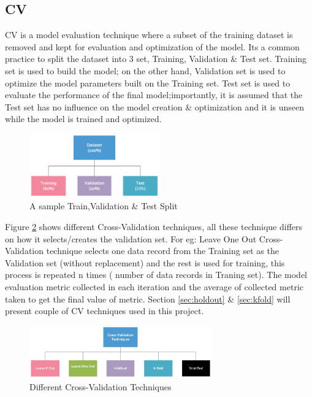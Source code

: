 \documentclass[twoside,11pt,a4paper]{article}
\begin{document}
\subsection{\acf{CV}}

\acf{CV} is a model evaluation technique where a subset of the training dataset is removed and kept for evaluation and optimization of the model. Its a common practice to split the dataset into 3 set, Training, Validation \& Test set. Training set is used to build the model; on the other hand, Validation set is used to optimize the model parameters built on the Training set. Test set is used to evaluate the performance of the final model;importantly, it is assumed that the Test set has no influence on the model creation \& optimization and it is unseen while the model is trained and optimized.\\
\begin{figure}[ht]
	\centering
	\includegraphics[width=0.5\textwidth]{dataset_split}
	\caption[A sample Train,Validation \& Test Split]{A sample Train,Validation \& Test Split}
	\label{fig:dataset_split}
\end{figure}

Figure \ref{fig:cv_techniques} shows different Cross-Validation techniques, all these technique differs on how it selects/creates the validation set. For eg: Leave One Out Cross-Validation technique selects one data record from the Training set as the Validation set (without replacement) and the rest is used for training, this process is repeated n times ( number of data records in Traning set). The model evaluation metric collected in each iteration and the average of collected metric taken to get the final value of metric. Section \ref{sec:holdout} \& \ref{sec:kfold} will present couple of \acs{CV} techniques used in this project.\\
\begin{figure}[ht]
	\centering
	\includegraphics[width=0.7\textwidth]{cv_techniques}
	\caption[Different Cross-Validation Techniques]{Different Cross-Validation Techniques}
	\label{fig:cv_techniques}
\end{figure}
\end{document}
